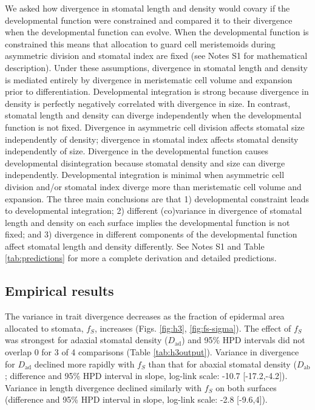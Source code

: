 \documentclass[
  12pt,
]{article}
\begin{document}
We asked how divergence in stomatal length and density would covary if the developmental function were constrained and compared it to their divergence when the developmental function can evolve. When the developmental function is constrained this means that allocation to guard cell meristemoids during asymmetric division and stomatal index are fixed (see Notes S1 for mathematical description). Under these assumptions, divergence in stomatal length and density is mediated entirely by divergence in meristematic cell volume and expansion prior to differentiation. Developmental integration is strong because divergence in density is perfectly negatively correlated with divergence in size. In contrast, stomatal length and density can diverge independently when the developmental function is not fixed. Divergence in asymmetric cell division affects stomatal size independently of density; divergence in stomatal index affects stomatal density independently of size. Divergence in the developmental function causes developmental disintegration because stomatal density and size can diverge independently. Developmental integration is minimal when asymmetric cell division and/or stomatal index diverge more than meristematic cell volume and expansion. The three main conclusions are that 1) developmental constraint leads to developmental integration; 2) different (co)variance in divergence of stomatal length and density on each surface implies the developmental function is not fixed; and 3) divergence in different components of the developmental function affect stomatal length and density differently. See Notes S1 and Table \ref{tab:predictions} for more a complete derivation and detailed predictions.

\hypertarget{empirical-results}{%
\subsection{Empirical results}\label{empirical-results}}

The variance in trait divergence decreases as the fraction of epidermal area allocated to stomata, \(f_S\), increases (Figs. \ref{fig:h3}, \ref{fig:fs-sigma}). The effect of \(f_S\) was strongest for adaxial stomatal density (\(D_\text{ad}\)) and 95\% HPD intervals did not overlap 0 for 3 of 4 comparisons (Table \ref{tab:h3output}). Variance in divergence for \(D_\text{ad}\) declined more rapidly with \(f_S\) than that for abaxial stomatal density (\(D_\text{ab}\); difference and 95\% HPD interval in slope, log-link scale: -10.7 {[}-17.2,-4.2{]}). Variance in length divergence declined similarly with \(f_S\) on both surfaces (difference and 95\% HPD interval in slope, log-link scale: -2.8 {[}-9.6,4{]}).
\end{document}
